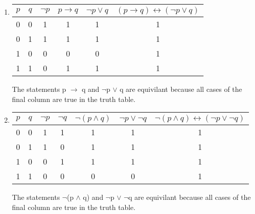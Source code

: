 \documentclass[11pt]{article}
\begin{document}
\begin{enumerate}
\item
\begin{tabular}{|c|c|c|c|c|c|}
\hline
$p$ & $q$ & $\lnot p$ & $p \rightarrow q$ & $\lnot p \lor q$ & $(p \rightarrow q) \leftrightarrow  (\lnot p \lor q)$ \\
\hline
0 & 0 & 1 & 1 & 1 & 1\\
0 & 1 & 1 & 1 & 1 & 1\\
1 & 0 & 0 & 0 & 0 & 1\\
1 & 1 & 0 & 1 & 1 & 1\\
\hline
\end{tabular}
\newline
The statements p $\rightarrow$ q and $\neg$p $\lor$ q are equivilant because all cases of the final column are true in the truth table.

\item
\begin{tabular}{|c|c|c|c|c|c|c|}
\hline
$p$ & $q$ & $\lnot p$ & $\lnot q$ & $\lnot(p \land q)$ & $\lnot p \lor  \lnot q$ & $\lnot(p \land q) \leftrightarrow  (\lnot p \lor \lnot q)$ \\
\hline
0 & 0 & 1 & 1 & 1 & 1 & 1\\
0 & 1 & 1 & 0 & 1 & 1 & 1\\
1 & 0 & 0 & 1 & 1 & 1 & 1\\
1 & 1 & 0 & 0 & 0 & 0 & 1\\
\hline
\end{tabular}
\newline
The statements $\neg$(p $\wedge$ q) and $\neg$p $\lor$ $\neg$q are equivilant because all cases of the final column are true in the truth table.
\end{enumerate}
\end{document}
